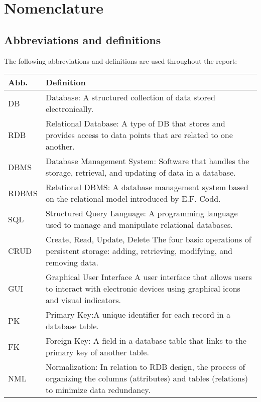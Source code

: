 \chapter*{Nomenclature}

\section{Abbreviations and definitions}
\label{sec:abbreviations}
The following abbreviations and definitions are used throughout the report:

\renewcommand{\arraystretch}{2}
\begin{longtable}{l p{13.5cm}}
    \textbf{Abb.}  & \textbf{Definition}  \\ \hline
        DB           & Database: A structured collection of data stored electronically. \\ \hline
        RDB          & Relational Database: A type of DB that stores and provides access to data points that are related to one another. \\ \hline
        DBMS         & Database Management System: Software that handles the storage, retrieval, and updating of data in a database. \\ \hline
        RDBMS        & Relational DBMS: A database management system based on the relational model introduced by E.F. Codd. \\ \hline
        SQL          & Structured Query Language: A programming language used to manage and manipulate relational databases. \\ \hline
        CRUD         & Create, Read, Update, Delete The four basic operations of persistent storage: adding, retrieving, modifying, and removing data. \\ \hline
        GUI          & Graphical User Interface  A user interface that allows users to interact with electronic devices using graphical icons and visual indicators. \\ \hline
        PK           & Primary Key:A unique identifier for each record in a database table. \\ \hline
        FK           & Foreign Key: A field in a database table that links to the primary key of another table. \\ \hline
        NML          & Normalization: In relation to RDB design, the process of organizing the columns (attributes) and tables (relations) to minimize data redundancy. \\ \hline

\end{longtable}
